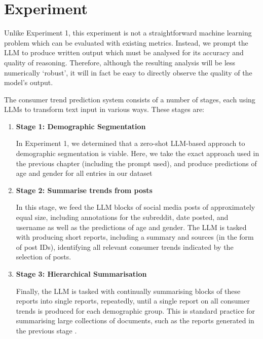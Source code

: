\documentclass{report}
\begin{document}
\section{Experiment}


Unlike Experiment 1, this experiment is not a straightforward machine learning problem which can be evaluated with existing metrics. Instead, we prompt the LLM to produce written output which must be analysed for its accuracy and quality of reasoning. Therefore, although the resulting analysis will be less numerically `robust', it will in fact be easy to directly observe the quality of the model's output.

The consumer trend prediction system consists of a number of stages, each using LLMs to transform text input in various ways. These stages are:

\begin{enumerate}
    \item \textbf{Stage 1: Demographic Segmentation}
    
    In Experiment 1, we determined that a zero-shot LLM-based approach to demographic segmentation is viable. Here, we take the exact approach used in the previous chapter (including the prompt used), and produce predictions of age and gender for all entries in our dataset
    
    \item \textbf{Stage 2: Summarise trends from posts}
    
    In this stage, we feed the LLM blocks of social media posts of approximately equal size, including annotations for the subreddit, date posted, and username as well as the predictions of age and gender. The LLM is tasked with producing short reports, including a summary and sources (in the form of post IDs), identifying all relevant consumer trends indicated by the selection of posts.
    
    \item \textbf{Stage 3: Hierarchical Summarisation}
    
    Finally, the LLM is tasked with continually summarising blocks of these reports into single reports, repeatedly, until a single report on all consumer trends is produced for each demographic group. This is standard practice for summarising large collections of documents, such as the reports generated in the previous stage .
\end{enumerate}
\end{document}
